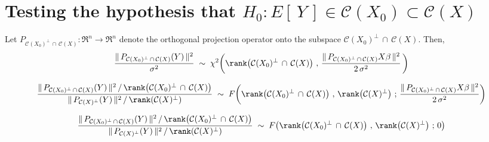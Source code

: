 \documentclass{article}
\begin{document}

\section{Testing the hypothesis that $H_{0}: E[\,Y\,] \in \mathcal{C}(X_{0}) \subset \mathcal{C}(X)$}
\setcounter{theorem}{0}

\begin{proposition}\mbox{}\vskip 0.1cm
\noindent
Let $P_{\mathcal{C}(X_{0})^{\perp}\,\cap\,\mathcal{C}(X)} : \Re^{n} \longrightarrow \Re^{n}$ denote the orthogonal projection operator onto the subspace $\mathcal{C}(X_{0})^{\perp}\,\cap\,\mathcal{C}(X)$.  Then,
\begin{equation*}
\dfrac{\Vert\,P_{\mathcal{C}(X_{0})^{\perp}\,\cap\,\mathcal{C}(X)}(Y)\,\Vert^{2}}{\sigma^{2}} \; \sim \; \chi^{2}\!\left(\rank\!\left(\mathcal{C}(X_{0})^{\perp}\,\cap\,\mathcal{C}(X)\right)\,,\,\dfrac{\Vert\,P_{\mathcal{C}(X_{0})^{\perp}\,\cap\,\mathcal{C}(X)}X\beta\,\Vert^{2}}{2\,\sigma^{2}}\,\right)
\end{equation*}
\end{proposition}

\vskip 0.5cm
\begin{corollary}
\begin{equation*}
\dfrac
{\Vert\,P_{\mathcal{C}(X_{0})^{\perp}\,\cap\,\mathcal{C}(X)}(Y)\,\Vert^{2}\,/\,\rank\!\left(\mathcal{C}(X_{0})^{\perp}\,\cap\,\mathcal{C}(X)\right)}
{\Vert\,P_{\mathcal{C}(X)^{\perp}}(Y)\,\Vert^{2}\,/\,\rank\!\left(\mathcal{C}(X)^{\perp}\right)}
\;\sim\;
F\!\left(
\rank\!\left(\mathcal{C}(X_{0})^{\perp}\,\cap\,\mathcal{C}(X)\right)
\,,\,
\rank\!\left(\mathcal{C}(X)^{\perp}\right)
\,;\,
\dfrac{\Vert\,P_{\mathcal{C}(X_{0})^{\perp}\,\cap\,\mathcal{C}(X)}X\beta\,\Vert^{2}}{2\,\sigma^{2}}
\right)
\end{equation*}
\end{corollary}

\vskip 0.5cm
\begin{corollary}
\begin{equation*}
\dfrac
{\Vert\,P_{\mathcal{C}(X_{0})^{\perp}\,\cap\,\mathcal{C}(X)}(Y)\,\Vert^{2}\,/\,\rank\!\left(\mathcal{C}(X_{0})^{\perp}\,\cap\,\mathcal{C}(X)\right)}
{\Vert\,P_{\mathcal{C}(X)^{\perp}}(Y)\,\Vert^{2}\,/\,\rank\!\left(\mathcal{C}(X)^{\perp}\right)}
\;\sim\;
F\!\left(
\rank\!\left(\mathcal{C}(X_{0})^{\perp}\,\cap\,\mathcal{C}(X)\right)
\,,\,
\rank\!\left(\mathcal{C}(X)^{\perp}\right)
\,;\,
0
\right)
\end{equation*}
\end{corollary}
\end{document}
